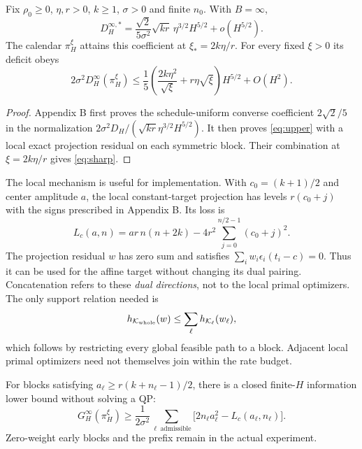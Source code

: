 \begin{theorem}\label{thm:sharp}
Fix $\rho_0\ge0$, $\eta,r>0$, $k\ge1$, $\sigma>0$ and finite $n_0$. With $B=\infty$,
\begin{equation}
 \boxed{D_H^{\infty,*}
 =\frac{\sqrt2}{5\sigma^2}\sqrt{kr}\,\eta^{3/2}H^{5/2}
 +o(H^{5/2}).}\label{eq:sharp}
\end{equation}
The calendar $\pi_H^\xi$ attains this coefficient at $\xi_*=2k\eta/r$. For every fixed $\xi>0$ its deficit obeys
\begin{equation}
 2\sigma^2 D_H^{\infty}(\pi_H^\xi)
 \le\frac15\left(\frac{2k\eta^2}{\sqrt\xi}+r\eta\sqrt\xi\right)H^{5/2}
 +O(H^2).\label{eq:upper}
\end{equation}
\end{theorem}
\begin{proof}
Appendix B first proves the schedule-uniform converse coefficient $2\sqrt2/5$ in the normalization $2\sigma^2D_H/(\sqrt{kr}\eta^{3/2}H^{5/2})$. It then proves \eqref{eq:upper} with a local exact projection residual on each symmetric block. Their combination at $\xi=2k\eta/r$ gives \eqref{eq:sharp}.\end{proof}

The local mechanism is useful for implementation. With $c_0=(k+1)/2$ and center amplitude $a$, the local constant-target projection has levels $r(c_0+j)$ with the signs prescribed in Appendix B. Its loss is
\begin{equation}
 L_c(a,n)=ar\,n(n+2k)-4r^2\sum_{j=0}^{n/2-1}(c_0+j)^2.\label{eq:Lc}
\end{equation}
The projection residual $w$ has zero sum and satisfies $\sum_iw_i\epsilon_i(t_i-c)=0$. Thus it can be used for the affine target without changing its dual pairing. Concatenation refers to these \emph{dual directions}, not to the local primal optimizers. The only support relation needed is
\begin{equation}
 h_{\mathcal K_{\rm whole}}(w)\le\sum_\ell h_{\mathcal K_\ell}(w_\ell),\label{eq:support}
\end{equation}
which follows by restricting every global feasible path to a block. Adjacent local primal optimizers need not themselves join within the rate budget.

For blocks satisfying $a_\ell\ge r(k+n_\ell-1)/2$, there is a closed finite-$H$ information lower bound without solving a QP:
\begin{equation}
 G_H^\infty(\pi_H^\xi)\ge\frac1{2\sigma^2}
 \sum_{\ell\ \mathrm{admissible}}
 \bigl[2n_\ell a_\ell^2-L_c(a_\ell,n_\ell)\bigr].\label{eq:closedG}
\end{equation}
Zero-weight early blocks and the prefix remain in the actual experiment.

